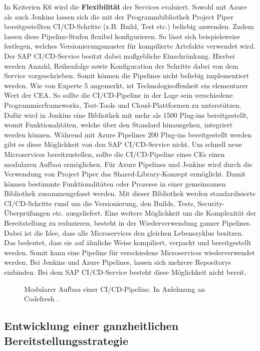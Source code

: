 In Kriterien K6 wird die \textbf{Flexibilität} der Services evaluiert. Sowohl mit Azure als auch Jenkins lassen sich die mit der Programmbibliothek Project Piper bereitgestellten CI/CD-Schritte (z.B. Build, Test etc.) beliebig anwenden. Zudem lassen diese Pipeline-Stufen flexibel konfigurieren. So lässt sich beispielsweise festlegen, welches Versionierungsmuster für kompilierte Artefakte verwendet wird. Der SAP CI/CD-Service besitzt dabei maßgebliche Einschränkung. Hierbei werden Anzahl, Reihenfolge sowie Konfiguration der Schritte dabei von dem Service vorgeschrieben. Somit können die Pipelines nicht beliebig implementiert werden. Wie von Experte 5 angemerkt, ist Technologieoffenheit ein elementarer Wert der CEA. So sollte die CI/CD-Pipeline in der Lage sein verschiedene Programmierframeworks, Test-Tools und Cloud-Plattformen zu unterstützen. Dafür wird in Jenkins eine Bibliothek mit mehr als 1500 Plug-ins bereitgestellt, womit Funktionalitäten, welche über den Standard hinausgehen, integriert werden können. Während mit Azure Pipelines 200 Plug-ins bereitgestellt werden gibt es diese Möglichkeit von den SAP CI/CD-Service nicht. Um schnell neue Microservices bereitzustellen, sollte die CI/CD-Pipeline eines CEs einen modularen Aufbau ermöglichen. Für Azure Pipelines und Jenkins wird durch die Verwendung von Project Piper das Shared-Library-Konzept ermöglicht. Damit können bestimmte Funktionalitäten oder Prozesse in einer gemeinsamen Bibliothek zusammengefasst werden. Mit dieser Bibliothek werden standardisierte CI/CD-Schritte rund um die Versionierung, den Builds, Tests, Security-Überprüfungen etc. ausgeliefert. Eine weitere Möglichkeit um die Komplexität der Bereitstellung zu reduzieren, besteht in der Wiederverwendung ganzer Pipelines. Dabei ist die Idee, dass alle Microservices den gleichen Lebenszyklus besitzen. Das bedeutet, dass sie auf ähnliche Weise kompiliert, verpackt und bereitgestellt werden. Somit kann eine Pipeline für verschiedene Microservices wiederverwendet werden. Bei Jenkins und Azure Pipelines, lassen sich mehrere Repositorys einbinden. Bei dem SAP CI/CD-Service besteht diese Möglichkeit nicht bereit.
\begin{center}
	\begin{figure}[H]
		\centering
		\caption[Modularer Aufbau einer CI/CD-Pipeline]{Modularer Aufbau einer CI/CD-Pipeline. In Anlehnung an Codefresh \cite{.20230402}.}
		\label{fig:metrik_qual}
	\end{figure}
\end{center}
\vspace*{-15mm}





\subsection{Entwicklung einer ganzheitlichen Bereitstellungsstrategie}
 